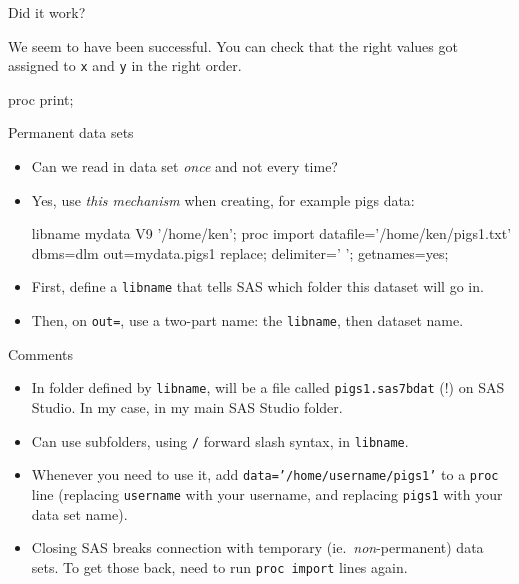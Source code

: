 \documentclass[unknownkeysallowed]{beamer}\usepackage[]{graphicx}\usepackage[]{color}
\begin{document}
\begin{frame}[fragile]{Did it work?}
  
      We seem to have been successful. You can check that the right values
  got assigned to \texttt{x} and \texttt{y} in the right order.

  
  \begin{Sascode}[store=mc]
proc print;    
  \end{Sascode}
  

\end{frame}

\begin{frame}[fragile]{Permanent data sets}
  \begin{itemize}
  \item Can we read in data set \emph{once} and not every time?
  \item Yes, use \emph{this mechanism} when creating, for
    example pigs data:

\begin{Datastep}
libname mydata V9 '/home/ken';
proc import
  datafile='/home/ken/pigs1.txt'
    dbms=dlm 
    out=mydata.pigs1
    replace;
  delimiter=' ';
  getnames=yes;
\end{Datastep}

\item First, define a \texttt{libname} that tells SAS which folder
  this dataset will go in.
\item Then, on \texttt{out=}, use a two-part name: the
  \texttt{libname}, then dataset name.


  \end{itemize}
\end{frame}

\begin{frame}[fragile]{Comments}
  \begin{itemize}
  \item In folder defined by \texttt{libname}, will be a file called
    \texttt{pigs1.sas7bdat} (!) on SAS Studio. In my case, in my main
    SAS Studio folder.
\item Can use subfolders, using \texttt{/} forward slash syntax, in
  \texttt{libname}. 

\item Whenever you need to use it, add
  \texttt{data='/home/username/pigs1'} to a \texttt{proc} line
  (replacing \texttt{username} with your username, and replacing
  \texttt{pigs1} with your data set name).
\item Closing SAS breaks connection with temporary (ie.\
  \emph{non}-permanent) data sets. To get those back, need to run
  \texttt{proc import} lines again. 

  \end{itemize}
\end{frame}
\end{document}
